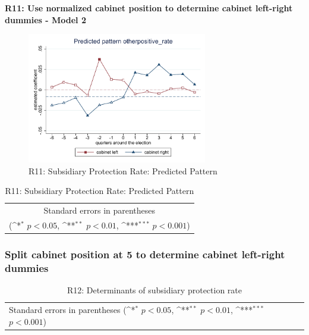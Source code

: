 \documentclass[10pt,a4paper]{scrartcl}
\begin{document}
\clearpage
\textbf{R11: Use normalized cabinet position to determine cabinet left-right dummies - Model 2}
\begin{figure}[!ht]
	\centering
	\includegraphics[width=0.7\textwidth]{figures_edited/otherpositive_rate_graph2_R11.pdf}
	\caption{R11: Subsidiary Protection Rate: Predicted Pattern}
\end{figure}

\begin{table}[!ht]\centering
	\footnotesize
	\renewcommand{\arraystretch}{1.2}
	\def\sym#1{\ifmmode^{#1}\else\(^{#1}\)\fi}
	\caption{R11: Subsidiary Protection Rate: Predicted Pattern}
	\begin{tabular}{l*{2}{c}}
		\hline\hline
		
		\hline\hline
		\multicolumn{3}{c}{\footnotesize Standard errors in parentheses} \\
		\multicolumn{3}{c}{\footnotesize (\sym{*} \(p<0.05\), \sym{**} \(p<0.01\), \sym{***} \(p<0.001\))} \\
	\end{tabular}
\end{table}





\clearpage
\FloatBarrier
\subsubsection{Split cabinet position at 5 to determine cabinet left-right dummies}
\begin{table}[!ht]\centering
	\renewcommand{\arraystretch}{1.25}
	\small
	\def\sym#1{\ifmmode^{#1}\else\(^{#1}\)\fi}
	\caption{R12: Determinants of subsidiary protection rate}
	\begin{tabular}{l*{3}{c}}
		\hline\hline
		
		\hline\hline
		\multicolumn{4}{l}{\footnotesize Standard errors in parentheses (\sym{*} \(p<0.05\), \sym{**} \(p<0.01\), \sym{***} \(p<0.001\))}\\
	\end{tabular}
\end{table}
\end{document}

